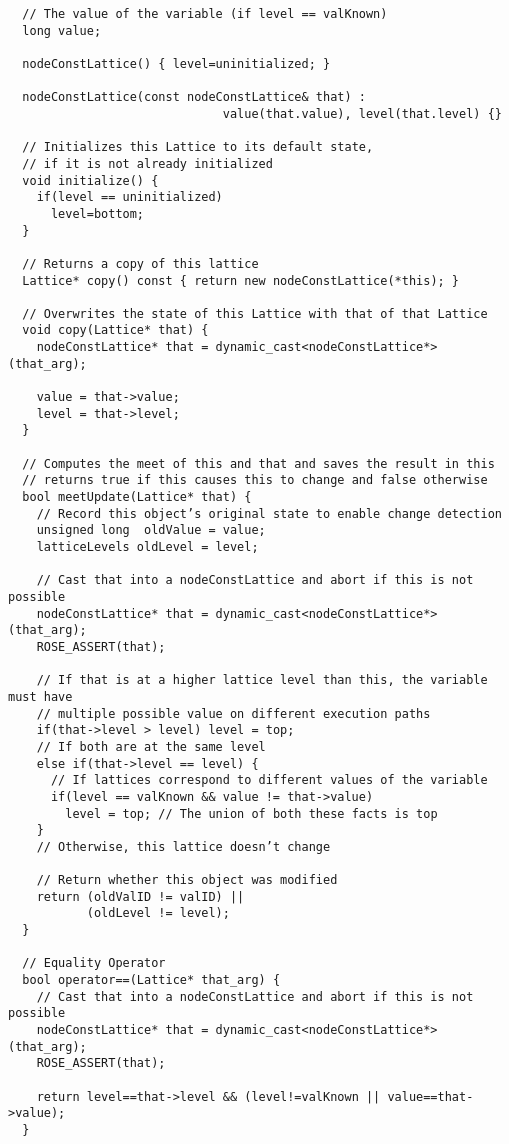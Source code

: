 {\begin{frame}
\begin{lstlisting}
  // The value of the variable (if level == valKnown)
  long value;

  nodeConstLattice() { level=uninitialized; }
  
  nodeConstLattice(const nodeConstLattice& that) : 
                              value(that.value), level(that.level) {}

  // Initializes this Lattice to its default state, 
  // if it is not already initialized
  void initialize() {
    if(level == uninitialized)
      level=bottom;
  }
  
  // Returns a copy of this lattice
  Lattice* copy() const { return new nodeConstLattice(*this); }
  
  // Overwrites the state of this Lattice with that of that Lattice
  void copy(Lattice* that) {
    nodeConstLattice* that = dynamic_cast<nodeConstLattice*>(that_arg);
  
    value = that->value;
    level = that->level;
  }

  // Computes the meet of this and that and saves the result in this
  // returns true if this causes this to change and false otherwise
  bool meetUpdate(Lattice* that) {
    // Record this object’s original state to enable change detection
    unsigned long  oldValue = value;
    latticeLevels oldLevel = level;
    
    // Cast that into a nodeConstLattice and abort if this is not possible    
    nodeConstLattice* that = dynamic_cast<nodeConstLattice*>(that_arg);
    ROSE_ASSERT(that);

    // If that is at a higher lattice level than this, the variable must have 
    // multiple possible value on different execution paths
    if(that->level > level) level = top;
    // If both are at the same level
    else if(that->level == level) {
      // If lattices correspond to different values of the variable
      if(level == valKnown && value != that->value)
        level = top; // The union of both these facts is top
    }
    // Otherwise, this lattice doesn’t change
    
    // Return whether this object was modified
    return (oldValID != valID) ||
           (oldLevel != level);
  }
  
  // Equality Operator
  bool operator==(Lattice* that_arg) { 
    // Cast that into a nodeConstLattice and abort if this is not possible    
    nodeConstLattice* that = dynamic_cast<nodeConstLattice*>(that_arg);
    ROSE_ASSERT(that);
    
    return level==that->level && (level!=valKnown || value==that->value);
  }


\end{lstlisting}
\end{frame}}
